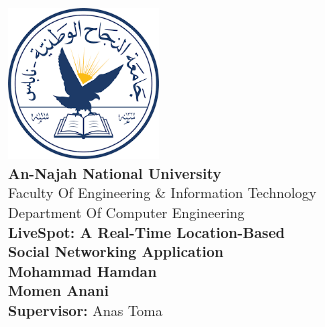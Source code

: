 \documentclass[a4paper,11pt,oneside]{book}
\begin{document}
    
    \frontmatter
    
    \begin{titlepage}      
        \begin{center}
            \vspace*{1cm}
            \includegraphics[width=4cm]{figures/NajahLogo.png}\\[1cm]
            
            {\Large\textbf{An-Najah National University}\\[0.8cm]
            \large Faculty Of Engineering \& Information Technology\\[0.5cm]
            Department Of Computer Engineering}\\[2.5cm]
            
            {\huge\textbf{
                    LiveSpot: A Real-Time Location-Based \\
                    Social Networking Application
            }}\\[2.5cm]
            
            {\LARGE\textbf{
                Mohammad Hamdan\\[0.3cm]
                Momen Anani
            }}\\[1cm] 
            
            {\large 
                \textbf{Supervisor:} Anas Toma}\\[2cm]
            

\end{center}
\end{titlepage}
\end{document}

